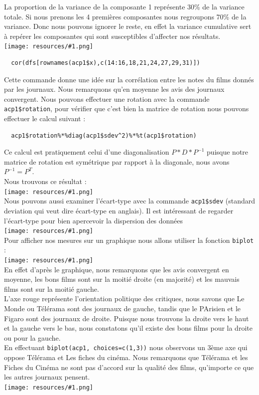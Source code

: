 \documentclass{report}
\newcommand{\photo}[1]{\\
    \texttt{[image: resources/\#1.png]}
\\
}
\begin{document}
La proportion de la variance de la composante 1 représente 30\% de la variance totale. Si nous prenons les 4
premières composantes nous regroupons 70\% de la variance. Donc nous pouvons ignorer le reste, en effet
la variance cumulative sert à repérer les composantes qui sont susceptibles d'affecter nos résultats.
\photo{10}
\begin{verbatim}
  cor(dfs[rownames(acp1$x),c(14:16,18,21,24,27,29,31)])
\end{verbatim}
Cette commande donne une idée sur la corrélation entre les notes du films donnés par les journaux. Nous
remarquons qu'en moyenne les avis des journaux convergent.
Nous pouvons effectuer une rotation avec la commande \texttt{acp1\$rotation}, pour vérifier que c'est
bien la matrice de rotation nous pouvons effectuer le calcul suivant :
\begin{verbatim}
  acp1$rotation%*%diag(acp1$sdev^2)%*%t(acp1$rotation)
\end{verbatim}
Ce calcul est pratiquement celui d'une diagonalisation $P*D*P^{-1}$ puisque notre matrice de rotation est
symétrique par rapport à la diagonale, nous avons $P^{-1}=P^T$. \\
Nous trouvons ce résultat :
\photo{11}
Nous pouvons aussi examiner l'écart-type avec la commande \texttt{acp1\$sdev} (standard deviation qui
veut dire écart-type en anglais). Il est intéressant de regarder l'écart-type
pour bien apercevoir la dispersion des données
\photo{16}
Pour afficher nos mesures sur un graphique nous allons utiliser la fonction \texttt{biplot} :
\photo{12}
En effet d'après le graphique, nous remarquons que les avis convergent en moyenne, les bons films sont sur la moitié droite
(en majorité) et les mauvais films sont sur la moitié gauche.\\
L'axe rouge représente l'orientation politique des critiques, nous savons que Le Monde ou Télérama sont
des journaux de gauche, tandis que le PArisien et le Figaro sont des journaux de droite.
Puisque nous trouvons la droite vers le haut et la gauche vers le bas, nous constatons qu'il existe des bons
films pour la droite ou pour la gauche.\\
En effectuant \texttt{biplot(acp1, choices=c(1,3))} nous observons un 3ème axe qui oppose Télérama et Les fiches du cinéma.
Nous remarquons que Télérama et les Fiches du Cinéma ne sont pas d'accord sur la qualité des films, qu'importe ce que
les autres journaux pensent.
\photo{13}
\end{document}
